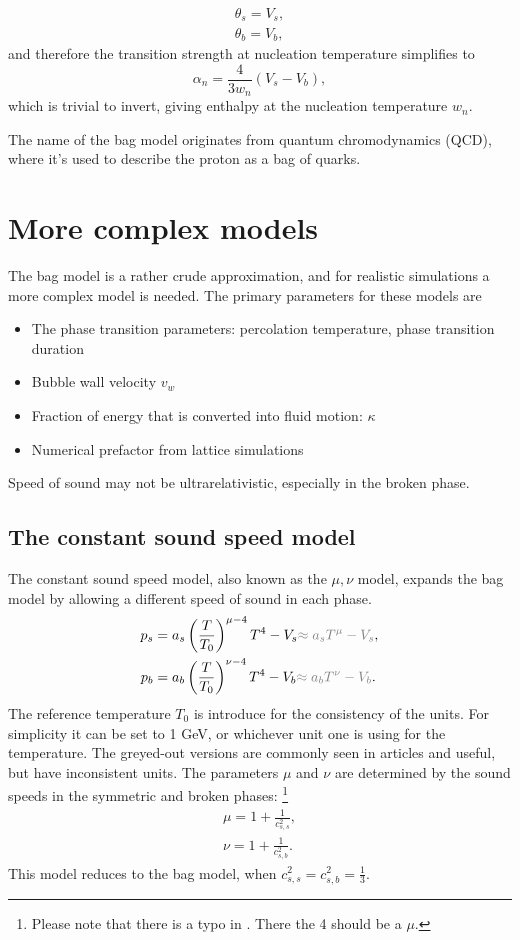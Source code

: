 \begin{align}
\theta_s = V_s, \\
\theta_b = V_b,
\end{align}
and therefore the transition strength at nucleation temperature simplifies to
\begin{equation}
\alpha_n = \frac{4}{3 w_n} (V_s - V_b),
\label{eq:alpha_n_bag}
\end{equation}
which is trivial to invert, giving enthalpy at the nucleation temperature $w_n$.

The name of the bag model originates from quantum chromodynamics (QCD), where it's used to describe the proton as a bag of quarks.


\section{More complex models}
The bag model is a rather crude approximation, and for realistic simulations a more complex model is needed.
The primary parameters for these models are
\begin{itemize}
    \item The phase transition parameters: percolation temperature, phase transition duration
    \item Bubble wall velocity $v_w$
    \item Fraction of energy that is converted into fluid motion: $\kappa$
    \item Numerical prefactor from lattice simulations
\end{itemize}

Speed of sound may not be ultrarelativistic, especially in the broken phase.

\subsection{The constant sound speed model}
The constant sound speed model, also known as the $\mu, \nu$ model,
expands the bag model by allowing a different speed of sound in each phase.
\cites[eq. 15]{giese_2021}[eq. 38]{giese_2020}
\begin{align}
p_s &= a_s \left( \frac{T}{T_0} \right)^{\mu-4} T^4 - V_s {\color{gray} \approx a_s T^\mu - V_s }, \\
p_b &= a_b \left( \frac{T}{T_0} \right)^{\nu-4} T^4 - V_b {\color{gray} \approx a_b T^\nu - V_b}.
\end{align}
The reference temperature $T_0$ is introduce for the consistency of the units.
For simplicity it can be set to 1 GeV, or whichever unit one is using for the temperature.
The greyed-out versions are commonly seen in articles and useful, but have inconsistent units.
The parameters $\mu$ and $\nu$ are determined by the sound speeds in the symmetric and broken phases:
\cites[eq. 16]{giese_2021}[eq. 39]{giese_2020}
\footnote{Please note that there is a typo in \cite[eq. 15]{giese_2021}. There the 4 should be a $\mu$.}
\begin{align}
\mu = 1 + \frac{1}{c_{s,s}^2}, \\
\nu = 1 + \frac{1}{c_{s,b}^2}.
\end{align}
This model reduces to the bag model,
when $c_{s,s}^2 = c_{s,b}^2 = \frac{1}{3}$.

